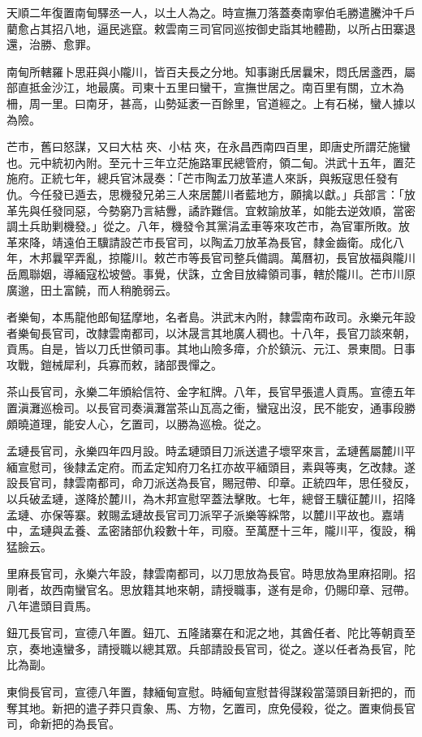 \begin{pinyinscope}
天順二年復置南甸驛丞一人，以土人為之。時宣撫刀落蓋奏南寧伯毛勝遣騰沖千戶藺愈占其招八地，逼民逃竄。敕雲南三司官同巡按御史詣其地體勘，以所占田寨退還，治勝、愈罪。

南甸所轄羅卜思莊與小隴川，皆百夫長之分地。知事謝氏居曩宋，悶氏居盞西，屬部直抵金沙江，地最廣。司東十五里曰蠻干，宣撫世居之。南百里有關，立木為柵，周一里。曰南牙，甚高，山勢延袤一百餘里，官道經之。上有石梯，蠻人據以為險。

芒市，舊曰怒謀，又曰大枯夾、小枯夾，在永昌西南四百里，即唐史所謂茫施蠻也。元中統初內附。至元十三年立茫施路軍民總管府，領二甸。洪武十五年，置茫施府。正統七年，總兵官沐晟奏：「芒市陶孟刀放革遣人來訴，與叛寇思任發有仇。今任發已遁去，思機發兄弟三人來居麓川者藍地方，願擒以獻。」兵部言：「放革先與任發同惡，今勢窮乃言結釁，譎詐難信。宜敕諭放革，如能去逆效順，當密調土兵助剿機發。」從之。八年，機發令其黨涓孟車等來攻芒市，為官軍所敗。放革來降，靖遠伯王驥請設芒市長官司，以陶孟刀放革為長官，隸金齒衛。成化八年，木邦曩罕弄亂，掠隴川。敕芒市等長官司整兵備調。萬曆初，長官放福與隴川岳鳳聯姻，導緬寇松坡營。事覺，伏誅，立舍目放緯領司事，轄於隴川。芒市川原廣邈，田土富饒，而人稍脆弱云。

者樂甸，本馬龍他郎甸猛摩地，名者島。洪武末內附，隸雲南布政司。永樂元年設者樂甸長官司，改隸雲南都司，以沐晟言其地廣人稠也。十八年，長官刀談來朝，貢馬。自是，皆以刀氏世領司事。其地山險多瘴，介於鎮沅、元江、景東間。日事攻戰，鎧械犀利，兵寡而敕，諸部畏憚之。

茶山長官司，永樂二年頒給信符、金字紅牌。八年，長官早張遣人貢馬。宣德五年置滇灘巡檢司。以長官司奏滇灘當茶山瓦高之衝，蠻寇出沒，民不能安，通事段勝頗曉道理，能安人心，乞置司，以勝為巡檢。從之。

孟璉長官司，永樂四年四月設。時孟璉頭目刀派送遣子壞罕來言，孟璉舊屬麓川平緬宣慰司，後隸孟定府。而孟定知府刀名扛亦故平緬頭目，素與等夷，乞改隸。遂設長官司，隸雲南都司，命刀派送為長官，賜冠帶、印章。正統四年，思任發反，以兵破孟璉，遂降於麓川，為木邦宣慰罕蓋法擊敗。七年，總督王驥征麓川，招降孟璉、亦保等寨。敕賜孟璉故長官司刀派罕子派樂等綵幣，以麓川平故也。嘉靖中，孟璉與孟養、孟密諸部仇殺數十年，司廢。至萬歷十三年，隴川平，復設，稱猛臉云。

里麻長官司，永樂六年設，隸雲南都司，以刀思放為長官。時思放為里麻招剛。招剛者，故西南蠻官名。思放籍其地來朝，請授職事，遂有是命，仍賜印章、冠帶。八年遣頭目貢馬。

鈕兀長官司，宣德八年置。鈕兀、五隆諸寨在和泥之地，其酋任者、陀比等朝貢至京，奏地遠蠻多，請授職以總其眾。兵部請設長官司，從之。遂以任者為長官，陀比為副。

東倘長官司，宣德八年置，隸緬甸宣慰。時緬甸宣慰昔得謀殺當蕩頭目新把的，而奪其地。新把的遣子莽只貢象、馬、方物，乞置司，庶免侵殺，從之。置東倘長官司，命新把的為長官。


\end{pinyinscope}
